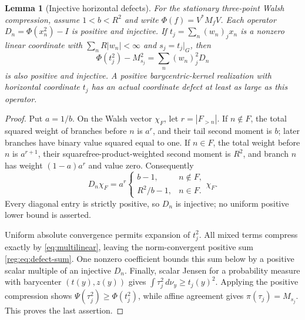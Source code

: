 \documentclass[11pt,letterpaper]{amsart}
\newtheorem{lemma}[theorem]{Lemma}
\theoremstyle{definition}
\theoremstyle{remark}
\numberwithin{equation}{section}
\begin{document}
\begin{lemma}[Injective horizontal defects]\label{reg:lem:injective}
For the stationary three-point Walsh compression, assume
$1<b<R^2$ and write $\Phi(f)=V^*M_fV$.
Each operator $D_n=\Phi(x_n^2)-I$ is positive and injective.
If $t_j=\sum_n(w_n)_jx_n$ is a nonzero linear coordinate with
$\sum_nR|w_n|<\infty$ and $s_j=t_j|_G$, then
\begin{equation}\label{reg:eq:defect-sum}
 \Phi(t_j^2)-M_{s_j}^2=\sum_n(w_n)_j^2D_n
\end{equation}
is also positive and injective. A positive barycentric-kernel
realization with horizontal coordinate $t_j$ has an actual
coordinate defect at least as large as this operator.
\end{lemma}
\begin{proof}
Put $a=1/b$. On the Walsh vector $\chi_F$, let $r=|F_{>n}|$.
If $n\notin F$, the total squared weight of branches before
$n$ is $a^r$, and their tail second moment is $b$; later branches
have binary value squared equal to one. If $n\in F$, the total
weight before $n$ is $a^{r+1}$, their squarefree-product-weighted
second moment is $R^2$, and branch $n$ has weight
$(1-a)a^r$ and value zero. Consequently
\[
 D_n\chi_F=a^r
 \begin{cases}
 b-1,&n\notin F,\\
 R^2/b-1,&n\in F.
 \end{cases}\chi_F.
\]
Every diagonal entry is strictly positive, so $D_n$ is injective;
no uniform positive lower bound is asserted.

Uniform absolute convergence permits expansion of $t_j^2$.
All mixed terms compress exactly by
\eqref{eq:multilinear}, leaving the norm-convergent positive sum
\eqref{reg:eq:defect-sum}. One nonzero coefficient bounds this
sum below by a positive scalar multiple of an injective $D_n$.
Finally, scalar Jensen for a probability measure with barycenter
$(t(y),z(y))$ gives $\int\tau_j^2\,d\nu_y\ge t_j(y)^2$.
Applying the positive compression shows
$\Psi(\tau_j^2)\ge\Phi(t_j^2)$, while affine agreement gives
$\pi(\tau_j)=M_{s_j}$. This proves the last assertion.
\end{proof}
\end{document}

